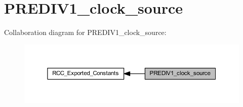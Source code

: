 \hypertarget{group___p_r_e_d_i_v1__clock__source}{}\section{P\+R\+E\+D\+I\+V1\+\_\+clock\+\_\+source}
\label{group___p_r_e_d_i_v1__clock__source}
Collaboration diagram for P\+R\+E\+D\+I\+V1\+\_\+clock\+\_\+source\+:
\nopagebreak
\begin{figure}[H]
\begin{center}
\leavevmode
\includegraphics[width=350pt]{group___p_r_e_d_i_v1__clock__source}
\end{center}
\end{figure}
